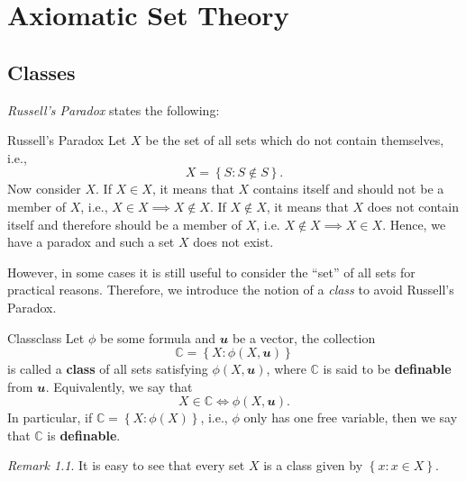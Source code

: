 \documentclass[math]{amznotes}
\theoremstyle{remark}
\newtheorem*{remark}{Remark}
\begin{document}
\tableofcontents

\chapter{Axiomatic Set Theory}
\section{Classes}
\textit{Russell's Paradox} states the following:
\begin{genbox}{Russell's Paradox}
    Let $X$ be the set of all sets which do not contain themselves, i.e.,
    \begin{equation*}
        X = \left\{S \colon S \notin S\right\}.
    \end{equation*}
    Now consider $X$. If $X \in X$, it means that $X$ contains itself and should not be a member of $X$, i.e., $X \in X \implies X \notin X$. If $X \notin X$, it means that $X$ does not contain itself and therefore should be a member of $X$, i.e. $X \notin X \implies X \in X$. Hence, we have a paradox and such a set $X$ does not exist.
\end{genbox}
However, in some cases it is still useful to consider the ``set'' of all sets for practical reasons. Therefore, we introduce the notion of a \textit{class} to avoid Russell's Paradox. 
\begin{dfnbox}{Class}{class}
    Let $\phi$ be some formula and $\mathbfit{u}$ be a vector, the collection
    \begin{displaymath}
        \mathbb{C} = \left\{X \colon \phi(X, \mathbfit{u})\right\}
    \end{displaymath}
    is called a {\color{red} \textbf{class}} of all sets satisfying $\phi(X, \mathbfit{u})$, where $\mathbb{C}$ is said to be {\color{red} \textbf{definable}} from $\mathbfit{u}$. Equivalently, we say that
    \begin{displaymath}
        X \in \mathbb{C} \iff \phi(X, \mathbfit{u}).
    \end{displaymath}
    In particular, if $\mathbb{C} = \left\{X \colon \phi(X)\right\}$, i.e., $\phi$ only has one free variable, then we say that $\mathbb{C}$ is {\color{red} \textbf{definable}}.
\end{dfnbox}
\begin{notebox}
    \begin{remark}
        It is easy to see that every set $X$ is a class given by $\left\{x \colon x \in X\right\}$.
    \end{remark}
\end{notebox}
\end{document}
